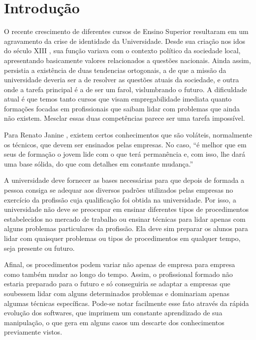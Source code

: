 \documentclass[conference]{IEEEtran}
\begin{document}
\section{Introdução}
	O recente crescimento de diferentes cursos de Ensino Superior resultaram em um agravamento da crise de identidade da Universidade. Desde sua criação nos idos do século XIII \cite{oliveira:origem_universidades} , sua função variava com o contexto político da sociedade local, apresentando basicamente valores relacionados a questões nacionais. Ainda assim, persistia a existência de duas tendencias ortogonais, a de que a missão da universidade deveria ser a de resolver as questões atuais da sociedade, e outra onde a tarefa principal é a de ser um farol, vislumbrando o futuro. A dificuldade atual é que temos tanto cursos que visam empregabilidade imediata quanto formações focadas em profissionais que saibam lidar com problemas que ainda não existem. Mesclar essas duas competências parece ser uma tarefa impossível. 

	Para Renato Janine \cite{ribeiro:universidade_vida_atual}, existem certos conhecimentos que são voláteis, normalmente os técnicos, que devem ser ensinados pelas empresas. No caso, ``é melhor que em seus      de formação o jovem lide com o que terá permanência e, com isso, lhe dará uma base sólida, do que com detalhes em constante mudança.''

	A universidade deve fornecer as bases necessárias para que depois de formada a pessoa consiga se adequar aos diversos padrões utilizados pelas empresas no exercício da profissão cuja qualificação foi obtida na universidade. Por isso, a universidade não deve se preocupar em ensinar diferentes tipos de procedimentos estabelecidos no mercado de trabalho ou ensinar técnicas para lidar apenas com alguns problemas particulares da profissão. Ela deve sim preparar os alunos para lidar com quaisquer problemas ou tipos de procedimentos em qualquer tempo, seja presente ou futuro. 

	Afinal, os procedimentos podem variar não apenas de empresa para empresa como também mudar ao longo do tempo. Assim, o profissional formado não estaria preparado para o futuro e só conseguiria se adaptar a empresas que soubessem lidar com alguns determinados problemas e dominariam apenas algumas técnicas específicas. Pode-se notar facilmente esse fato através da rápida evolução dos softwares, que imprimem um constante aprendizado de sua manipulação, o que gera em alguns casos um descarte dos conhecimentos previamente vistos.  
\end{document}

